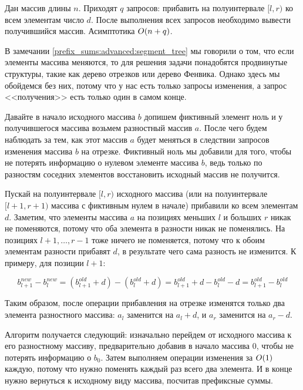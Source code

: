 \begin{problem}
    Дан массив длины $n$. Приходят $q$ запросов: прибавить на полуинтервале $[l, r)$ ко всем элементам число $d$. После выполнения всех запросов необходимо вывести получившийся массив. Асимптотика $O(n + q)$.
\end{problem}

\begin{solution}
    В замечании \ref{prefix_sums:advanced:segment_tree} мы говорили о том, что если элементы массива меняются, то для решения задачи понадобятся продвинутые структуры, такие как дерево отрезков или дерево Фенвика. Однако здесь мы обойдемся без них, потому что у нас есть только запросы изменения, а запрос <<получения>> есть только один в самом конце.

    Давайте в начало исходного массива $b$ допишем фиктивный элемент ноль и у получившегося массива возьмем разностный массив $a$. После чего будем наблюдать за тем, как этот массив $a$ будет меняться в следствии запросов изменения массива $b$ на отрезке.
    Фиктивный ноль мы добавили для того, чтобы не потерять информацию о нулевом элементе массива $b$, ведь только по разностям соседних элементов восстановить исходный массив не получится.

    Пускай на полуинтервале $[l, r)$ исходного массива (или на полуинтервале $[l + 1, r + 1)$ массива с фиктивным нулем в начале) прибавили ко всем элементам $d$.
    Заметим, что элементы массива $a$ на позициях меньших $l$ и больших $r$ никак не поменяются, потому что оба элемента в разности никак не поменялись. На позициях $l + 1, \ldots, r - 1$ тоже ничего не поменяется, потому что к обоим элементам разности прибавят $d$, в результате чего сама разность не изменится. К примеру, для позиции $l + 1$:

$$
b^{new}_{l + 1} - b^{new}_{l} = \left(b^{old}_{l + 1} + d\right) - \left(b^{old}_l + d\right) = b^{old}_{l + 1} + d - b^{old}_l - d = b^{old}_{l + 1} - b^{old}_l
$$

Таким образом, после операции прибавления на отрезке изменятся только два элемента разностного массива: $a_{l}$ заменится на $a_{l} + d$, и $a_r$ заменится на $a_r - d$.

Алгоритм получается следующий: изначально перейдем от исходного массива к его разностному массиву, предварительно добавив в начало массива $0$, чтобы не потерять информацию о $b_0$.
Затем выполняем операции изменения за $O(1)$ каждую, потому что нужно поменять каждый раз всего два элемента. И в конце нужно вернуться к исходному виду массива, посчитав префиксные суммы.
\end{solution}

